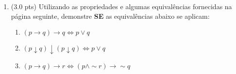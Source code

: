 \documentclass[12pt]{article}
\begin{document}
\begin{enumerate}
\item (3.0 pts) Utilizando as propriedades e algumas equivalências
fornecidas na página seguinte, demonstre {\bf SE} as equivalências abaixo 
se aplicam:

\begin{enumerate}
\setlength{\itemsep}{-2pt}

\item $(p \rightarrow q) \rightarrow q \Leftrightarrow p \vee q$ %











\item $(p \downarrow q) \downarrow  (p \downarrow q) \Leftrightarrow p \vee q $




\item $(p \rightarrow q) \rightarrow r \Leftrightarrow  (p \wedge \sim r) \rightarrow \sim q$ %

\end{enumerate}






\end{enumerate}
\newpage
\end{document}
